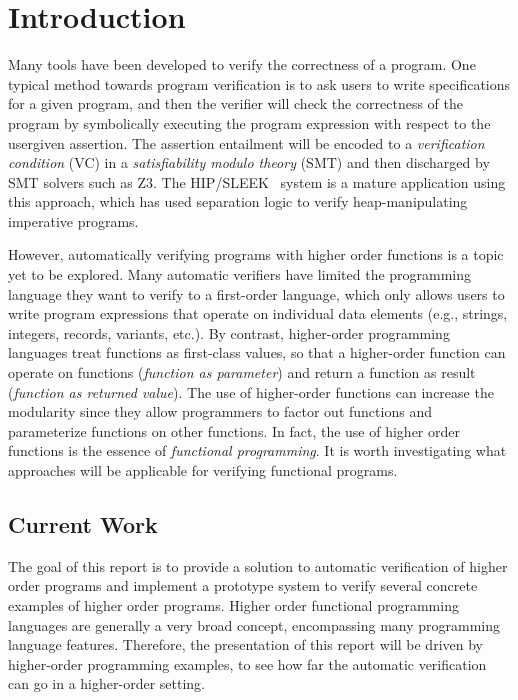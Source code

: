 
\chapter{Introduction}
\vspace{2em}



Many tools have been developed to verify the correctness of a program. One typical method towards program verification is to ask users to write specifications for a given program, and then the verifier will check the correctness of the program by symbolically executing the program expression with respect to the user\zz{}given assertion. The assertion entailment will be encoded to a \emph{verification condition} (VC) in a \emph{satisfiability modulo theory} (SMT) and then discharged by SMT solvers such as Z3. The HIP/SLEEK~\cite{Chin2012HipSleek} system is a mature application using this approach, which has used separation logic to verify heap-manipulating imperative programs.

However, automatically verifying programs with higher order functions is a topic yet to be explored. Many automatic verifiers have limited the programming language they want to verify to a first-order language, which only allows users to write program expressions that operate on individual data elements (e.g., strings, integers, records, variants, etc.). By contrast, higher-order programming languages treat functions as first-class values, so that a higher-order function can operate on functions (\emph{function as parameter}) and return a function as result (\emph{function as returned value}). The use of higher-order functions can increase the modularity since they allow programmers to factor out functions and parameterize functions on other functions. In fact, the use of higher order functions is the essence of \emph{functional programming}. It is worth investigating what approaches will be applicable for verifying functional programs.


\section{Current Work}

The goal of this report is to provide a solution to automatic verification of higher order programs and implement a prototype system to verify several concrete examples of higher order programs. Higher order functional programming languages are generally a very broad concept, encompassing many programming language features. Therefore, the presentation of this report will be driven by higher-order programming examples, to see how far the automatic verification can go in a higher-order setting.

